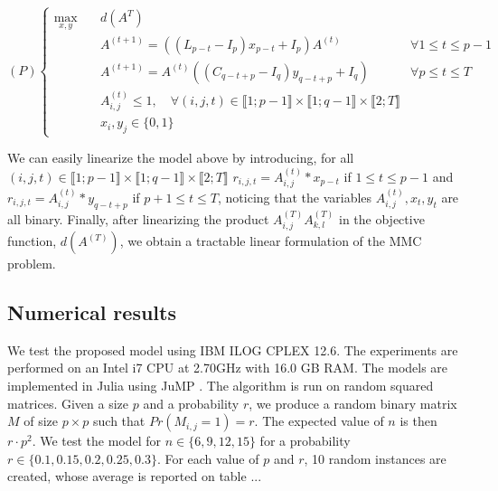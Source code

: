 \begin{equation*}
(P)\left\{
\begin{array}{lll}
\max\limits_{x,y}  \quad	& d(A^T)  \\
& A^{(t+1)}= ((L_{p-t}-I_p)x_{p-t}+I_p)A^{(t)} \qquad & \forall 1\le t\le p-1\\
& A^{(t+1)}= A^{(t)}((C_{q-t+p}-I_q)y_{q-t+p}+I_q) \qquad & \forall p\leq t\le T\\
& A^{(t)}_{i,j} \le 1, \quad \forall (i,j,t) \in \llbracket 1; p-1 \rrbracket \times \llbracket 1; q-1 \rrbracket \times \llbracket 2; T \rrbracket \\
& x_i,y_j \in \{0,1\}
\end{array}\right.
\end{equation*}

\noindent We can easily linearize the model above by introducing, for all $(i,j,t) \in \llbracket 1; p-1 \rrbracket \times \llbracket 1; q-1 \rrbracket \times \llbracket 2; T \rrbracket $ $r_{i,j,t}=A^{(t)}_{i,j}*x_{p-t}$ if $1\le t\le p-1$ and $r_{i,j,t}=A^{(t)}_{i,j}*y_{q-t+p}$ if $p+1\le t\le T$, noticing that the variables $A^{(t)}_{i,j},x_t,y_t$ are all binary. Finally, after linearizing the product $A^{(T)}_{i,j}A^{(T)}_{k,l}$ in the objective function, $d(A^{(T)})$, we obtain a tractable linear formulation of the MMC problem.



\subsection{Numerical results}

We test the proposed model using IBM ILOG CPLEX 12.6. The experiments are performed on an Intel i7 CPU at 2.70GHz with 16.0 GB RAM. The models are implemented in Julia using JuMP \cite{Lubin2015}. The algorithm is run on random squared matrices. Given a size $p$ and a probability $r$, we produce a random binary matrix $M$ of size $p \times p$ such that $Pr(M_{i,j} = 1) = r$. The expected value of $n$ is then $r \cdot p^2$. We test the model for $n \in \{6,9,12,15\}$ for a probability $r \in \{0.1,0.15,0.2,0.25,0.3\}$. For each value of $p$ and $r$, 10 random instances are created, whose average is reported on table ...
